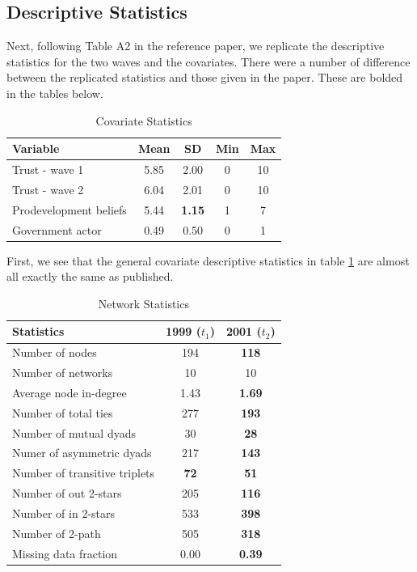 \documentclass[12pt]{article} %
\numberwithin{equation}{section}		%
\numberwithin{figure}{section}			%
\numberwithin{table}{section}				%
\begin{document}
\subsection{Descriptive Statistics}
Next, following Table A2 in the reference paper, we replicate the descriptive statistics for the two waves and the covariates. There were a number of difference between the replicated statistics and those given in the paper. These are bolded in the tables below.

\begin{table}[ht]
 	   \caption{\label{tab01} Covariate Statistics}
 	\centering
 	\begin{tabular}{lcccc}
 		\hline
 		Variable & Mean & SD & Min & Max \\ 	
 		\hline
 		Trust - wave 1 & 5.85 & 2.00 & 0 & 10 \\
 		Trust - wave 2 & 6.04 & 2.01 & 0 & 10 \\
 		Prodevelopment beliefs & 5.44 & \textbf{1.15} & 1 & 7 \\
 		Government actor & 0.49 & 0.50 & 0 & 1 \\
 		\hline
 	\end{tabular}
\end{table}

First, we see that the general covariate descriptive statistics in table \ref{tab01} are almost all exactly the same as published.

\begin{table}[ht]
 	   \caption{\label{tab02} Network Statistics}
 	\centering
 	\begin{tabular}{lcc}
 		\hline
 		Statistics & 1999 ($t_1$) & 2001 ($t_2$) \\ 	
 		\hline
 		Number of nodes & 194 & \textbf{118} \\
 		Number of networks & 10 & 10 \\
 		Average node in-degree & 1.43 & \textbf{1.69} \\
 		Number of total ties & 277 & \textbf{193} \\
 		Number of mutual dyads & 30 & \textbf{28} \\
 		Numer of asymmetric dyads & 217 & \textbf{143} \\
 		Number of transitive triplets & \textbf{72} & \textbf{51} \\
 		Number of out 2-stars & 205 & \textbf{116} \\
 		Number of in 2-stars & 533 & \textbf{398} \\
 		Number of 2-path & 505 & \textbf{318} \\
 		Missing data fraction & 0.00 & \textbf{0.39} \\
 		\hline
 	\end{tabular}
\end{table}
\end{document}
